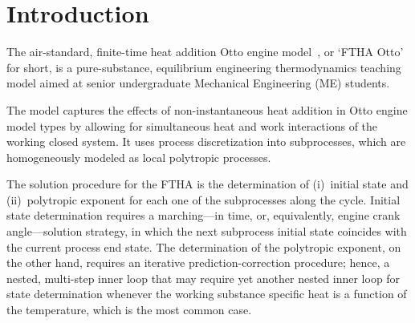 
\section{Introduction}

    The air-standard, finite-time heat addition Otto engine model~\cite{2017-NaaktgeborenC-IntJMechEngEduc}, or `FTHA Otto'  for
    short, is a pure-substance, equilibrium engineering thermodynamics teaching model aimed at senior  undergraduate  Mechanical
    Engineering (ME) students.

    The model captures the effects of non-in\-stan\-ta\-neous  heat  addition  in  Otto  engine  model  types  by  allowing  for
    simultaneous heat and work interactions of the working closed system. It  uses  process  discretization  into  subprocesses,
    which are homogeneously modeled as local polytropic processes.

    The solution procedure for the FTHA is the determination of (i)~initial state and (ii)~polytropic exponent for each  one  of
    the subprocesses along the cycle. Initial state determination requires a marching---in time, or, equivalently, engine  crank
    angle---solution strategy, in which the next subprocess initial state coincides with the  current  process  end  state.  The
    determination of the polytropic exponent, on the other hand, requires an iterative prediction-correction procedure; hence, a
    nested, multi-step inner loop that may require yet another nested inner loop for state determination  whenever  the  working
    substance specific heat is a function of the temperature, which is the most common case.


